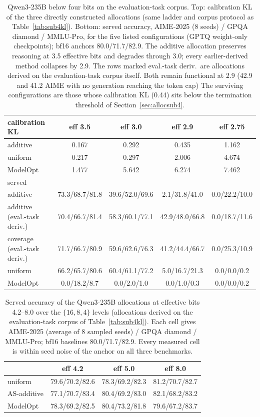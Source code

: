 \begin{table}[t]
\centering\footnotesize
\caption{Qwen3-235B below four bits on the evaluation-task corpus. Top: calibration KL of the
three directly constructed allocations (same ladder and corpus protocol as
Table~\ref{tab:sub4kl}). Bottom: served accuracy, AIME-2025 (8 seeds) / GPQA diamond /
MMLU-Pro, for the five listed configurations (GPTQ weight-only checkpoints); bf16 anchors 80.0/71.7/82.9.
The additive allocation preserves reasoning at 3.5 effective bits and degrades through 3.0;
every earlier-derived method collapses by 2.9. The rows marked eval.-task deriv.\ are
allocations derived on the evaluation-task corpus itself. 
Both remain functional at 2.9 (42.9 and 41.2 AIME with no
generation reaching the token cap) The surviving configurations are those whose calibration KL (0.44) sits below the
termination threshold of Section~\ref{sec:allocsub4}.}
\label{tab:sub4b235}
\begin{tabular}{lcccc}
\toprule
calibration KL & eff 3.5 & eff 3.0 & eff 2.9 & eff 2.75 \\
\midrule
additive & 0.167 & 0.292 & 0.435 & 1.162 \\
uniform & 0.217 & 0.297 & 2.006 & 4.674 \\
ModelOpt & 1.477 & 5.642 & 6.274 & 7.462 \\
\midrule
served & & & & \\
additive & 73.3/68.7/81.8 & 39.6/52.0/69.6 & 2.1/31.8/41.0 & 0.0/22.2/10.0 \\
additive (eval.-task deriv.) & 70.4/66.7/81.4 & 58.3/60.1/77.1 & 42.9/48.0/66.8 & 0.0/18.7/11.6 \\
coverage (eval.-task deriv.) & 71.7/66.7/80.9 & 59.6/62.6/76.3 & 41.2/44.4/66.7 & 0.0/25.3/10.9 \\
uniform & 66.2/65.7/80.6 & 60.4/61.1/77.2 & 5.0/16.7/21.3 & 0.0/0.0/0.2 \\
ModelOpt & 0.0/18.2/8.7 & 0.0/2.0/1.0 & 0.0/1.0/0.3 & 0.0/0.0/0.2 \\
\bottomrule
\end{tabular}
\end{table}

\begin{table}[t]
\centering\footnotesize
\caption{Served accuracy of the Qwen3-235B allocations at effective bits 4.2--8.0 over the
$\{16,8,4\}$ levels (allocations derived on the evaluation-task corpus of
Table~\ref{tab:sub4kl}).
Each cell gives AIME-2025 (average of 8 sampled seeds) / GPQA diamond / MMLU-Pro; bf16 baselines
80.0/71.7/82.9. Every measured cell is within seed noise of the anchor on all three benchmarks.}
\label{tab:ge4served235}
\begin{tabular}{lccc}
\toprule
 & eff 4.2 & eff 5.0 & eff 8.0 \\
\midrule
uniform & 79.6/70.2/82.6 & 78.3/69.2/82.3 & 81.2/70.7/82.7 \\
AS-additive & 77.1/70.7/83.4 & 80.4/69.2/83.0 & 82.1/68.2/83.2 \\
ModelOpt & 78.3/69.2/82.5 & 80.4/73.2/81.8 & 79.6/67.2/83.7 \\
\bottomrule
\end{tabular}
\end{table}

